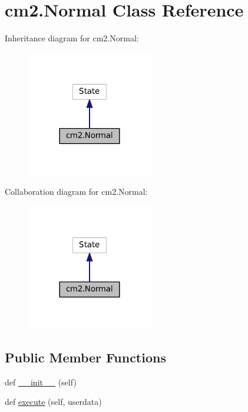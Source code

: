 \hypertarget{classcm2_1_1Normal}{}\section{cm2.\+Normal Class Reference}
\label{classcm2_1_1Normal}


Inheritance diagram for cm2.\+Normal\+:\nopagebreak
\begin{figure}[H]
\begin{center}
\leavevmode
\includegraphics[width=156pt]{classcm2_1_1Normal__inherit__graph}
\end{center}
\end{figure}


Collaboration diagram for cm2.\+Normal\+:\nopagebreak
\begin{figure}[H]
\begin{center}
\leavevmode
\includegraphics[width=156pt]{classcm2_1_1Normal__coll__graph}
\end{center}
\end{figure}
\subsection*{Public Member Functions}
\begin{DoxyCompactItemize}
\item 
def \hyperlink{classcm2_1_1Normal_a71a03bebb254240c81040d933e74c36b}{\+\_\+\+\_\+init\+\_\+\+\_\+} (self)
\item 
def \hyperlink{classcm2_1_1Normal_a4a1a55b9944acbc6ab98718e5d24da2b}{execute} (self, userdata)
\end{DoxyCompactItemize}
